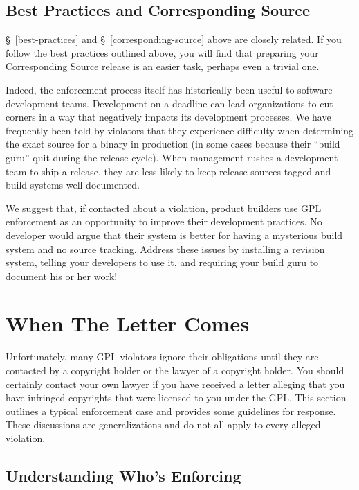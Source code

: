 \section{Best Practices and Corresponding Source}

\S~\ref{best-practices} and \S~\ref{corresponding-source} above are
closely related.  If you follow the best practices outlined above, you
will find that preparing your Corresponding Source release is an easier
task, perhaps even a trivial one.

Indeed, the enforcement process itself has historically been useful to
software development teams.  Development on a deadline can lead
organizations to cut corners in a way that negatively impacts its
development processes.  We have frequently been told by violators that
they experience difficulty when determining the exact source for a binary
in production (in some cases because their ``build guru'' quit during the
release cycle).  When management rushes a development team to ship a
release, they are less likely to keep release sources tagged and build
systems well documented.

We suggest that, if contacted about a violation, product builders use GPL
enforcement as an opportunity to improve their development practices.  No
developer would argue that their system is better for having a mysterious
build system and no source tracking.  Address these issues by installing a
revision system, telling your developers to use it, and requiring your
build guru to document his or her work!

\chapter{When The Letter Comes}

Unfortunately, many GPL violators ignore their obligations until they are
contacted by a copyright holder or the lawyer of a copyright holder.  You
should certainly contact your own lawyer if you have received a letter
alleging that you have infringed copyrights that were licensed to you
under the GPL\@.  This section outlines a typical enforcement case and
provides some guidelines for response.  These discussions are
generalizations and do not all apply to every alleged violation.

\section{Understanding Who's Enforcing}
\label{compliance-understanding-whos-enforcing}

